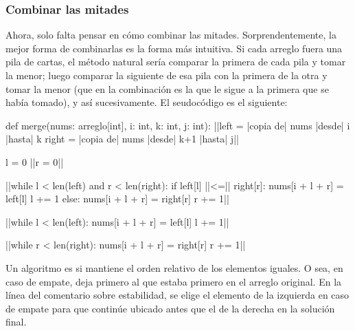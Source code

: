 \subsubsection{Combinar las mitades}

Ahora, solo falta pensar en cómo combinar las mitades. Sorprendentemente, la mejor forma de combinarlas es la forma más intuitiva. Si cada arreglo fuera una pila de cartas, el método natural sería comparar la primera de cada pila y tomar la menor; luego comparar la siguiente de esa pila con la primera de la otra y tomar la menor (que en la combinación es la que le sigue a la primera que se había tomado), y así sucesivamente. El seudocódigo es el siguiente:
\begin{pseudocode}
def merge(nums: arreglo[int], i: int, k: int, j: int):
    ||left = |\textrm{copia de}| nums |\textrm{desde}| i |\textrm{hasta}| k
    right = |\textrm{copia de}| nums |\textrm{desde}| k+1 |\textrm{hasta}| j||

    l = 0
    ||r = 0||

    ||while l < len(left) and r < len(right):
        if left[l] ||<=|| right[r]:
            nums[i + l + r] = left[l]
            l += 1
        else:
            nums[i + l + r] = right[r]
            r += 1||

    ||while l < len(left):
        nums[i + l + r] = left[l]
        l += 1||

    ||while r < len(right):
        nums[i + l + r] = right[r]
        r += 1||
\end{pseudocode}
\begin{annotations}
\end{annotations}

Un algoritmo es  si mantiene el orden relativo de los elementos iguales. O sea, en caso de empate, deja primero al que estaba primero en el arreglo original. En la línea del comentario sobre estabilidad, se elige el elemento de la izquierda en caso de empate para que continúe ubicado antes que el de la derecha en la solución final.


